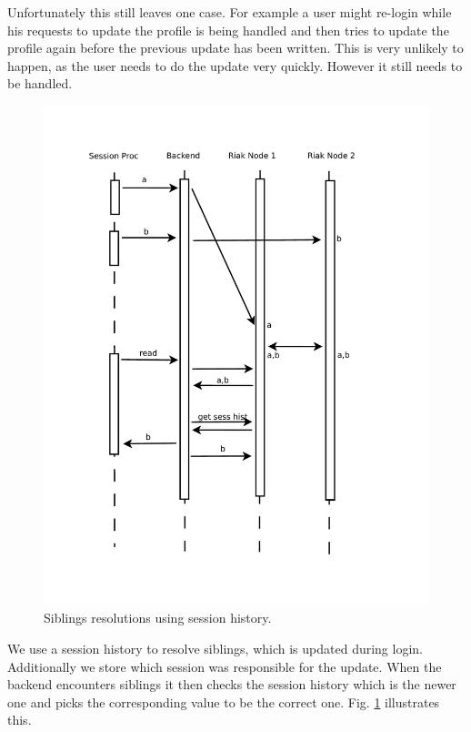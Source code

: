 \documentclass[11pt,a4paper]{report}
\begin{document}
Unfortunately this still leaves one case.
For example a user might re-login while his requests to update the profile is
being handled and then tries to update the profile again before the previous
update has been written.
This is very unlikely to happen, as the user needs to do the update very
quickly.
However it still needs to be handled.
\begin{figure}[htbp!]
  \centering
 \includegraphics[width=13cm]{./graphics/Concurrency_-_Conflict_resolution_using_session_history.pdf}
 \vspace{-1cm}
 \caption{Siblings resolutions using session history.}
 \label{fig:concurrency:history}
\end{figure}
We use a session history to resolve siblings, which is updated during login.
Additionally we store which session was responsible for the update.
When the backend encounters siblings it then checks the session history which
is the newer one and picks the corresponding value to be the correct one.
Fig. \ref{fig:concurrency:history} illustrates this.
\end{document}
